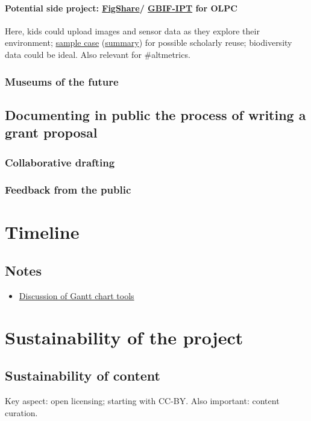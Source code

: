 \documentclass[final,authoryear,3p]{elsarticle-open-drafting}
\begin{document}
\paragraph{Potential side project: \href{http://figshare.com/}{FigShare}/ \href{http://www.gbif.org/communications/news-and-events/showsingle/article/new-incentive-for-biodiversity-data-publishing/}{GBIF-IPT} for OLPC} 
Here, kids could upload images and sensor data as they explore their environment; \href{http://dx.doi.org/10.3897/zookeys.89.903}{sample case} (\href{http://www.eurekalert.org/pub_releases/2011-05/pp-snh051711.php}{summary}) for possible scholarly reuse; biodiversity data could be ideal. Also relevant for \#altmetrics.
\subsubsection{Museums of the future}
\subsection{Documenting in public the process of writing a grant proposal}
\subsubsection{Collaborative drafting}
\subsubsection{Feedback from the public}

\section{Timeline}

\subsection{Notes}
\begin{itemize}
	\item \href{http://ff.im/D6rQ0}{Discussion of Gantt chart tools}
\end{itemize}

\section{Sustainability of the project}
\subsection{Sustainability of content}
Key aspect: open licensing; starting with CC-BY.
Also important: content curation.
\end{document}
